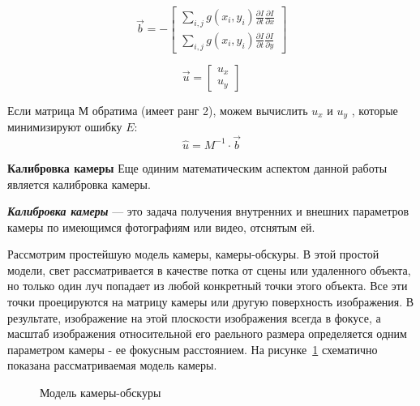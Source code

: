 $$
\vec{b} = -
\left[ 	
\begin{array}{c}
\sum \limits_{i,j} g(x_i, y_i) 
			\frac{\partial I}{\partial t} 										\frac{\partial I}{\partial x}  \\ 
\sum \limits_{i,j} g(x_i, y_i) 
			\frac{\partial I}{\partial t} 										\frac{\partial I}{\partial y}
\end{array} 
\right]
$$

$$
\vec{u} = 
\left[ 	
\begin{array}{c}
  u_x\\ 
	u_y
\end{array} 
\right]
$$

Если матрица М обратима (имеет ранг 2), можем вычислить $u_x$ и $u_y$ , которые минимизируют ошибку $E$\cite{habrOpticalFlowAbout}:
$$
\widehat{u} = M^{-1} \cdot \vec{b}
$$

\textbf{Калибровка камеры}
\label{part:calibrateCamera}
Еще одиним математическим аспектом данной работы является калибровка камеры. 

\textit{\textbf{Калибровка камеры}} — это задача получения внутренних и внешних параметров камеры по имеющимся фотографиям или видео, отснятым ей\cite{wikiCalibrate}.

Рассмотрим простейшую модель камеры, камеры-обскуры. В этой простой модели, свет рассматривается в качестве потка от сцены или удаленного объекта, но только один луч попадает из любой конкретный точки этого объекта. Все эти точки проецируются на матрицу камеры или другую поверхность изображения. В результате, изображение на этой плоскости изображения всегда в фокусе, а масштаб изображения относительной его раельного размера определяется одним параметром камеры -  ее фокусным расстоянием. На рисунке~\ref{pic:cameraModel} схематично показана рассматриваемая модель камеры\cite{OpenCVBook}. 

\begin{figure}[!htb]
\caption{Модель камеры-обскуры}
\label{pic:cameraModel}
\end{figure}

